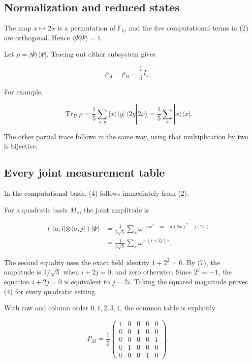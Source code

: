 \documentclass[11pt,a4paper]{article}
\begin{document}
\subsection{Normalization and reduced states}

The map \(x\mapsto2x\) is a permutation of \(\mathbb F_5\), and the five
computational terms in (2) are orthogonal. Hence
\(\langle\Psi|\Psi\rangle=1\).

Let \(\rho=|\Psi\rangle\langle\Psi|\). Tracing out either subsystem
gives

\[
 \rho_A=\rho_B=\frac15I_5.
 \tag{8}
\]

For example,

\[
 \operatorname{Tr}_B\rho
 =\frac15\sum_{x,y}|x\rangle\langle y|\,
   \langle2y|2x\rangle
 =\frac15\sum_x|x\rangle\langle x|.
\]

The other partial trace follows in the same way, using that
multiplication by two is bijective.

\subsection{Every joint measurement table}

In the computational basis, (4) follows immediately from (2).

For a quadratic basis \(M_a\), the joint amplitude is

\[
\begin{aligned}
 (\langle a,i|\otimes\langle a,j|)|\Psi\rangle
 &=\frac1{5\sqrt5}\sum_x
   \omega^{-a x^2-i x-a(2x)^2-j(2x)}\\
 &=\frac1{5\sqrt5}\sum_x\omega^{-(i+2j)x}.
\end{aligned}
 \tag{9}
\]

The second equality uses the exact field identity \(1+2^2=0\). By (7),
the amplitude is \(1/\sqrt5\) when \(i+2j=0\), and zero otherwise. Since
\(2^2=-1\), the equation \(i+2j=0\) is equivalent to \(j=2i\). Taking
the squared magnitude proves (4) for every quadratic setting.

With row and column order \(0,1,2,3,4\), the common table is explicitly

\[
 P_M=\frac15
 \begin{pmatrix}
 1&0&0&0&0\\
 0&0&1&0&0\\
 0&0&0&0&1\\
 0&1&0&0&0\\
 0&0&0&1&0
 \end{pmatrix}.
 \tag{10}
\]
\end{document}
